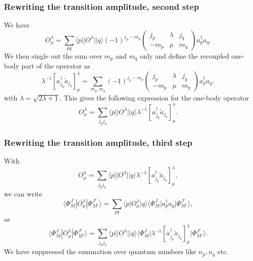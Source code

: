 \documentclass{beamer}
\begin{document}
\begin{frame}
\frametitle{Rewriting the transition amplitude, second step}

\begin{block}{}
We have
\[
O_{\mu}^{\lambda} = \sum_{pq} \langle p \vert \vert O^{\lambda}\vert \vert q \rangle (-1)^{j_p-m_p}\left(\begin{array}{ccc}  j_p & \lambda & j_q \\ -m_p & \mu & m_q\end{array}\right)a^{\dagger}_pa_q.
\]
We then single out the sum over $m_p$ and $m_q$ only and define the recoupled one-body part of the operator as 
\[
\lambda^{-1}\left[ a_{j_p}^{\dagger}\tilde{a}_{j_q}\right]^{\lambda}_{\mu} = \sum_{m_p,m_q} (-1)^{j_p-m_p}\left(\begin{array}{ccc}  j_p & \lambda & j_q \\ -m_p & \mu & m_q\end{array}\right)a^{\dagger}_pa_q,
\]
with $\lambda=\sqrt{2\lambda+1}$.
This gives the following expression for the one-body operator
\[
O_{\mu}^{\lambda} = \sum_{j_pj_q} \langle p \vert \vert O^{\lambda}\vert \vert q \rangle \lambda^{-1}\left[ a_{j_p}^{\dagger}\tilde{a}_{j_q}\right]^{\lambda}_{\mu}.
\]
\end{block}
\end{frame}

\begin{frame}
\frametitle{Rewriting the transition amplitude, third step}

\begin{block}{}
With 
\[
O_{\mu}^{\lambda} = \sum_{j_pj_q} \langle p \vert \vert O^{\lambda}\vert \vert q \rangle \lambda^{-1}\left[ a_{j_p}^{\dagger}\tilde{a}_{j_q}\right]^{\lambda}_{\mu},
\]
we can write 
\[
\langle \Phi^J_M|O^{\lambda}_{\mu}|\Phi^{J'}_{M'}\rangle = \sum_{pq} \langle p \vert O_{\mu}^{\lambda} \vert q \rangle \langle \Phi_{M}^{J} \vert a^{\dagger}_pa_q \vert \Phi_{M'}^{J'}\rangle,
\]
as
\[
\langle \Phi^J_M|O^{\lambda}_{\mu}|\Phi^{J'}_{M'}\rangle = \sum_{j_pj_q} \langle p \vert \vert O^{\lambda} \vert\vert q \rangle \langle \Phi_{M}^{J}\vert \lambda^{-1}\left[ a_{j_p}^{\dagger}\tilde{a}_{j_q}\right]^{\lambda}_{\mu}  \vert \Phi_{M'}^{J'}\rangle.
\]
We have suppressed the summation over quantum numbers like $n_p,n_q$ etc. 
\end{block}
\end{frame}
\end{document}
